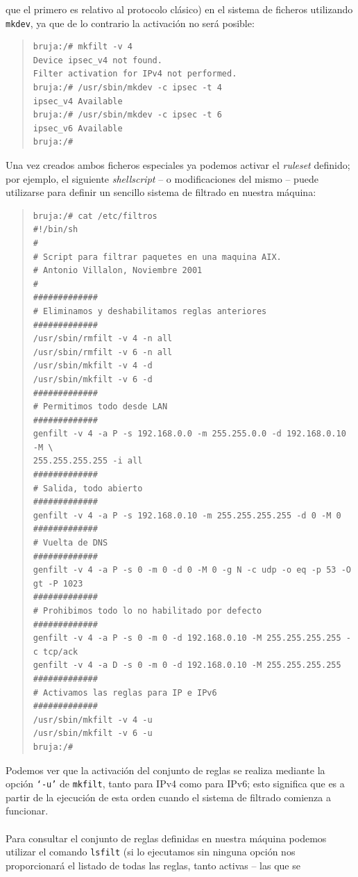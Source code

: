 que el primero es relativo al protocolo cl\'asico) en el sistema de ficheros 
utilizando {\tt mkdev}, ya que de lo contrario la activaci\'on no ser\'a 
posible:
\begin{quote}
\begin{verbatim}
bruja:/# mkfilt -v 4
Device ipsec_v4 not found.
Filter activation for IPv4 not performed.
bruja:/# /usr/sbin/mkdev -c ipsec -t 4
ipsec_v4 Available
bruja:/# /usr/sbin/mkdev -c ipsec -t 6
ipsec_v6 Available
bruja:/# 
\end{verbatim}
\end{quote}
Una vez creados ambos ficheros especiales ya podemos activar el {\it ruleset}
definido; por ejemplo, el siguiente {\it shellscript} -- o modificaciones del
mismo -- puede utilizarse para definir un sencillo sistema de filtrado en
nuestra m\'aquina:
\begin{quote}
\begin{verbatim}
bruja:/# cat /etc/filtros
#!/bin/sh
#
# Script para filtrar paquetes en una maquina AIX.
# Antonio Villalon, Noviembre 2001
#
#############
# Eliminamos y deshabilitamos reglas anteriores
#############
/usr/sbin/rmfilt -v 4 -n all
/usr/sbin/rmfilt -v 6 -n all
/usr/sbin/mkfilt -v 4 -d
/usr/sbin/mkfilt -v 6 -d
#############
# Permitimos todo desde LAN
#############
genfilt -v 4 -a P -s 192.168.0.0 -m 255.255.0.0 -d 192.168.0.10 -M \
255.255.255.255 -i all
#############
# Salida, todo abierto
#############
genfilt -v 4 -a P -s 192.168.0.10 -m 255.255.255.255 -d 0 -M 0
#############
# Vuelta de DNS
#############
genfilt -v 4 -a P -s 0 -m 0 -d 0 -M 0 -g N -c udp -o eq -p 53 -O gt -P 1023
#############
# Prohibimos todo lo no habilitado por defecto
#############
genfilt -v 4 -a P -s 0 -m 0 -d 192.168.0.10 -M 255.255.255.255 -c tcp/ack
genfilt -v 4 -a D -s 0 -m 0 -d 192.168.0.10 -M 255.255.255.255 
#############
# Activamos las reglas para IP e IPv6
#############
/usr/sbin/mkfilt -v 4 -u
/usr/sbin/mkfilt -v 6 -u
bruja:/#
\end{verbatim}
\end{quote}
Podemos ver que la activaci\'on del conjunto de reglas se realiza mediante la
opci\'on {\tt `-u'} de {\tt mkfilt}, tanto para IPv4 como para IPv6; esto 
significa que es a partir de la ejecuci\'on de esta orden cuando el sistema de 
filtrado comienza a funcionar.\\
\\Para consultar el conjunto de reglas definidas en nuestra m\'aquina podemos
utilizar el comando {\tt lsfilt} (si lo ejecutamos sin ninguna opci\'on nos
proporcionar\'a el listado de todas las reglas, tanto activas -- las que se 
